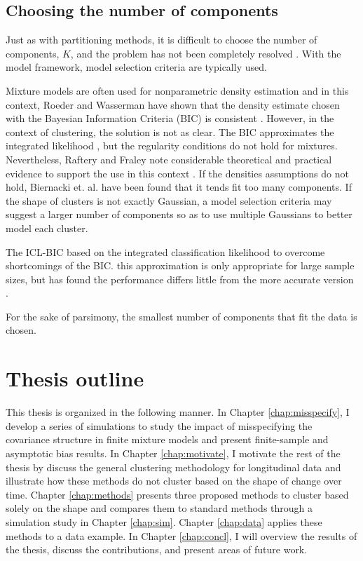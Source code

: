 \subsection{Choosing the number of components}
Just as with partitioning methods, it is difficult to choose the number of components, $K$, and the problem has not been completely resolved \cite{mclachlan2000}. With the model framework, model selection criteria are typically used.

Mixture models are often used for nonparametric density estimation and in this context, Roeder and Wasserman have shown that the density estimate chosen with the Bayesian Information Criteria (BIC) is consistent \cite{roeder1997}. However, in the context of clustering, the solution is not as clear. The BIC approximates the integrated likelihood \cite{schwarz1978}, but the regularity conditions do not hold for mixtures. Nevertheless, Raftery and Fraley note considerable theoretical and practical evidence to support the use in this context \cite{fraley1998}. If the densities assumptions do not hold, Biernacki et. al. \cite{biernacki2000} have been found that it tends fit too many components. If the shape of clusters is not exactly Gaussian, a model selection criteria may suggest a larger number of components so as to use multiple Gaussians to better model each cluster. 

The ICL-BIC based on the integrated classification likelihood to overcome shortcomings of the BIC. this approximation is only appropriate for large sample sizes, but has found the performance differs little from the more accurate version \cite{biernacki2000}.

For the sake of parsimony, the smallest number of components that fit the data is chosen.

\section{Thesis outline}
This thesis is organized in the following manner. In Chapter \ref{chap:misspecify}, I develop a series of simulations to study the impact of misspecifying the covariance structure in finite mixture models and present finite-sample and asymptotic bias results. In Chapter \ref{chap:motivate}, I motivate the rest of the thesis by discuss the general clustering methodology for longitudinal data and illustrate how these methods do not cluster based on the shape of change over time. Chapter \ref{chap:methods} presents three proposed methods to cluster based solely on the shape and compares them to standard methods through a simulation study in Chapter \ref{chap:sim}. Chapter \ref{chap:data} applies these methods to a data example. In Chapter \ref{chap:concl}, I will overview the results of the thesis, discuss the contributions, and present areas of future work. 

